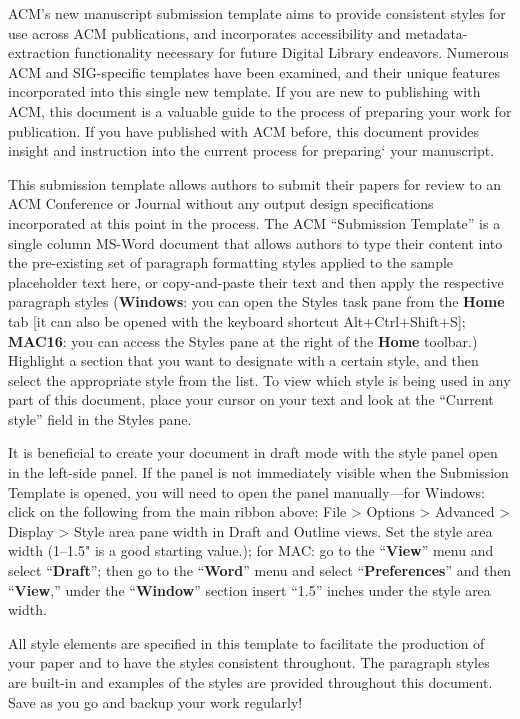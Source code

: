 \documentclass[conference]{IEEEtran}
\begin{document}
ACM's new manuscript submission template aims to provide consistent styles for use across ACM publications, and incorporates accessibility and metadata-extraction functionality necessary for future Digital Library endeavors. Numerous ACM and SIG-specific templates have been examined, and their unique features incorporated into this single new template. If you are new to publishing with ACM, this document is a valuable guide to the process of preparing your work for publication. If you have published with ACM before, this document provides insight and instruction into the current process for preparing` your manuscript.

This submission template allows authors to submit their papers for review to an ACM Conference or Journal without any output design specifications incorporated at this point in the process. The ACM “Submission Template” is a single column MS-Word document that allows authors to type their content into the pre-existing set of paragraph formatting styles applied to the sample placeholder text here, or copy-and-paste their text and \textcolor[rgb]{0.000,0.000,0.000}{then apply the respective paragraph }styles (\textbf{Windows}: you can open the Styles task pane from the \textbf{Home} tab [it can also be opened with the keyboard shortcut Alt+Ctrl+Shift+S]; \textbf{MAC16}: you can access the Styles pane at the right of the \textbf{Home} toolbar.) \textcolor[rgb]{0.000,0.000,0.000}{Highlight a section that you want to designate with a certain style, and then select the appropriate style from the list. }To view which style is being used in any part of this document, place your cursor on your text and look at the “Current style” field in the Styles pane.

It is beneficial to create your document in draft mode with the style panel open in the left-side panel. If the panel is not immediately visible when the Submission Template is opened, you will need to open the panel manually—for Windows: click on the following from the main ribbon above: File > Options > Advanced > Display > Style area pane width in Draft and Outline views. Set the style area width (1–1.5" is a good starting value.); for MAC: go to the “\textbf{View}” menu and select “\textbf{Draft}”; then go to the “\textbf{Word}” menu and select “\textbf{Preferences}” and then “\textbf{View},” under the “\textbf{Window}” section insert “1.5” inches under the style area width.

All style elements are specified in this template to facilitate the production of your paper and to have the styles consistent throughout. The paragraph styles are built-in and examples of the styles are provided throughout this document. Save as you go and backup your work regularly!
\end{document}
